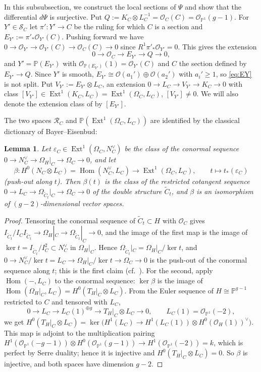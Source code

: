 \documentclass[11pt,twoside]{amsart}
\theoremstyle{plain}
\newtheorem{lemma}[theorem]{Lemma}
\theoremstyle{definition}
\newcommand{\PP}{\mathbb{P}}
\newcommand{\OO}{\mathcal{O}}
\newcommand{\Hom}{\operatorname{Hom}}
\newcommand{\Ext}{\operatorname{Ext}}
\newcommand{\Ct}{\widetilde{C}}
\newcommand{\SC}{\mathcal{S}_C}
\newcommand{\RC}{\mathcal{R}_C}
\begin{document}
In this subsubsection, we construct the local sections of $\Psi$ and show that the differential $d\Psi$ is surjective.
Put $Q:=K_C\otimes L_C^{-1}=\OO_C(C)=\OO_{\PP^1}(g-1)$. For $Y'\in\SC$ let $\pi'\colon Y'\to C$ be the ruling for which $C$ is a section and $E_{Y'}:=\pi'_*\OO_{Y'}(C)$. Pushing forward we have $0\to\OO_{Y'}\to\OO_{Y'}(C)\to\OO_C(C)\to0$ since $R^1\pi'_*\OO_{Y'}=0$. This gives the extension
\begin{equation}\label{eq:EY}
0\to\OO_C\to E_{Y'}\to Q\to0,
\end{equation}
and $Y'=\PP(E_{Y'})$ with $\OO_{\PP(E_{Y'})}(1)=\OO_{Y'}(C)$ and $C$ the section defined by $E_{Y'}\to Q$. Since $Y'$ is smooth, $E_{Y'}\cong\OO(a_1')\oplus\OO(a_2')$ with $a_i'\ge1$, so \eqref{eq:EY} is not split. Put $V_{Y'}:=E_{Y'}\otimes L_C$, an extension $0\to L_C\to V_{Y'}\to K_C\to0$ with class $[V_{Y'}]\in\Ext^1(K_C,L_C)=\Ext^1(\Omega_C,L_C)$, $[V_{Y'}]\ne0$. We will also denote the extension class of  by $[E_{Y'}]$.

The two spaces $\RC$ and $\PP(\Ext^1(\Omega_C,L_C))$ are identified by the classical dictionary of Bayer--Eisenbud:

\begin{lemma}\label{lem:beta}
Let $\varepsilon_C\in\Ext^1(\Omega_C,N_C^{\vee})$ be the class of the conormal sequence $0\to N_C^{\vee}\to\Omega_H|_C\to\Omega_C\to0$, and let
\[
\beta\colon H^0(N_C\otimes L_C)=\Hom(N_C^{\vee},L_C)\longrightarrow\Ext^1(\Omega_C,L_C),\qquad t\longmapsto t_*(\varepsilon_C)
\]
(push-out along $t$). Then $\beta(t)$ is the class of the restricted cotangent sequence $0\to L_C\to\Omega_{\Ct_t}|_C\to\Omega_C\to0$ of the double structure $\Ct_t$, and $\beta$ is an isomorphism of $(g-2)$-dimensional vector spaces.
\end{lemma}

\begin{proof}
Tensoring the conormal sequence of $\Ct_t\subset H$ with $\OO_C$ gives $I_{\Ct_t}/I_CI_{\Ct_t}\to\Omega_H|_C\to\Omega_{\Ct_t}|_C\to 0$, and the image of the first map is the image of $\ker t=I_{\Ct_t}/I_C^2\subset N_C^{\vee}$ in $\Omega_H|_C$. Hence $\Omega_{\Ct_t}|_C=\Omega_H|_C/\ker t$, and $0\to N_C^{\vee}/\ker t=L_C\to\Omega_H|_C/\ker t\to\Omega_C\to0$ is the push-out of the conormal sequence along $t$; this is the first claim (cf.\ \cite[Theorem~1.2]{BE95}). For the second, apply $\Hom(-,L_C)$ to the conormal sequence: $\ker\beta$ is the image of $\Hom(\Omega_H|_C,L_C)=H^0(T_H|_C\otimes L_C)$. From the Euler sequence of $H\cong\PP^{g-1}$ restricted to $C$ and tensored with $L_C$,
\[
0\to L_C\to L_C(1)^{\oplus g}\to T_H|_C\otimes L_C\to 0,\qquad L_C(1)=\OO_{\PP^1}(-2),
\]
we get $H^0(T_H|_C\otimes L_C)=\ker\big(H^1(L_C)\to H^1(L_C(1))\otimes H^0(\OO_H(1))^{\vee}\big)$. This map is adjoint to the multiplication pairing $H^1(\OO_{\PP^1}(-g-1))\otimes H^0(\OO_{\PP^1}(g-1))\to H^1(\OO_{\PP^1}(-2))=k$, which is perfect by Serre duality; hence it is injective and $H^0(T_H|_C\otimes L_C)=0$. So $\beta$ is injective, and both spaces have dimension $g-2$.
\end{proof}
\end{document}
